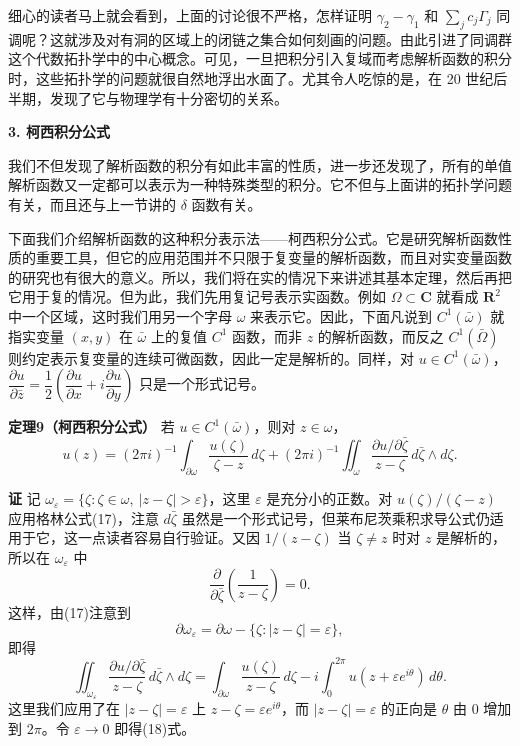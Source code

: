 细心的读者马上就会看到，上面的讨论很不严格，怎样证明 $\gamma_2-\gamma_1$ 和 $\sum_jc_j\Gamma_j$ 同调呢？这就涉及对有洞的区域上的闭链之集合如何刻画的问题。由此引进了同调群这个代数拓扑学中的中心概念。可见，一旦把积分引入复域而考虑解析函数的积分时，这些拓扑学的问题就很自然地浮出水面了。尤其令人吃惊的是，在 20 世纪后半期，发现了它与物理学有十分密切的关系。

\medskip
\noindent\textbf{3. 柯西积分公式}

我们不但发现了解析函数的积分有如此丰富的性质，进一步还发现了，所有的单值解析函数又一定都可以表示为一种特殊类型的积分。它不但与上面讲的拓扑学问题有关，而且还与上一节讲的 $\delta$ 函数有关。

下面我们介绍解析函数的这种积分表示法——柯西积分公式。它是研究解析函数性质的重要工具，但它的应用范围并不只限于复变量的解析函数，而且对实变量函数的研究也有很大的意义。所以，我们将在实的情况下来讲述其基本定理，然后再把它用于复的情况。但为此，我们先用复记号表示实函数。例如 $\Omega\subset\mathbf C$ 就看成 $\mathbf R^2$ 中一个区域，这时我们用另一个字母 $\omega$ 来表示它。因此，下面凡说到 $C^1(\bar\omega)$ 就指实变量 $(x,y)$ 在 $\bar\omega$ 上的复值 $C^1$ 函数，而非 $z$ 的解析函数，而反之 $C^1(\bar\Omega)$ 则约定表示复变量的连续可微函数，因此一定是解析的。同样，对 $u\in C^1(\bar\omega)$，$\dfrac{\partial u}{\partial\bar z}=\dfrac12\left(\dfrac{\partial u}{\partial x}+i\dfrac{\partial u}{\partial y}\right)$ 只是一个形式记号。

\noindent\textbf{定理9（柯西积分公式）}
若 $u\in C^1(\bar\omega)$，则对 $z\in\omega$，
\begin{equation}
 u(z)=(2\pi i)^{-1}\int_{\partial\omega}\frac{u(\zeta)}{\zeta-z}\,d\zeta
 +(2\pi i)^{-1}\iint_\omega\frac{\partial u/\partial\bar\zeta}{z-\zeta}\,d\bar\zeta\wedge d\zeta.
 \tag{18}
\end{equation}

\noindent\textbf{证}
记 $\omega_\varepsilon=\{\zeta:\zeta\in\omega,\ |z-\zeta|>\varepsilon\}$，这里 $\varepsilon$ 是充分小的正数。对 $u(\zeta)/(\zeta-z)$ 应用格林公式(17)，注意 $d\bar\zeta$ 虽然是一个形式记号，但莱布尼茨乘积求导公式仍适用于它，这一点读者容易自行验证。又因 $1/(z-\zeta)$ 当 $\zeta\ne z$ 时对 $z$ 是解析的，所以在 $\omega_\varepsilon$ 中
\[
 \frac{\partial}{\partial\bar\zeta}\left(\frac1{z-\zeta}\right)=0.
\]
这样，由(17)注意到
\[
 \partial\omega_\varepsilon=\partial\omega-\{\zeta:|z-\zeta|=\varepsilon\},
\]
即得
\[
 \iint_{\omega_\varepsilon}\frac{\partial u/\partial\bar\zeta}{z-\zeta}\,d\bar\zeta\wedge d\zeta
 =\int_{\partial\omega}\frac{u(\zeta)}{z-\zeta}\,d\zeta
 -i\int_0^{2\pi}u(z+\varepsilon e^{i\theta})\,d\theta.
\]
这里我们应用了在 $|z-\zeta|=\varepsilon$ 上 $z-\zeta=\varepsilon e^{i\theta}$，而 $|z-\zeta|=\varepsilon$ 的正向是 $\theta$ 由 0 增加到 $2\pi$。令 $\varepsilon\to0$ 即得(18)式。

